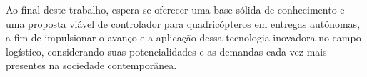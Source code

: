\documentclass[main.tex]{subfiles}
\begin{document}
 Ao final deste trabalho, espera-se oferecer uma base sólida de conhecimento e uma proposta viável de controlador para quadricópteros em entregas autônomas, a fim de impulsionar o avanço e a aplicação dessa tecnologia inovadora no campo logístico, considerando suas potencialidades e as demandas cada vez mais presentes na sociedade contemporânea.
\end{document}
